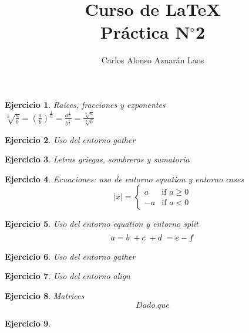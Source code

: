 \documentclass[12pt,a4paper]{article}
\author{Carlos Alonso Aznarán Laos}
\title{Curso de \LaTeX \\ Práctica  N$ ^{\circ}$2}
\newtheorem{ejer}{Ejercicio}%
\begin{document}
\maketitle %
\begin{ejer}
Raíces, fracciones y exponentes\\
$\sqrt[n]{\frac{a}{b}} = (\frac{{a}}{{b}})^\frac{1}{n} = \frac{a^{\frac{1}{n}}}{b^{\frac{1}{n}}} = \frac{\sqrt[n]{a}}{\sqrt[n]{b}}$
\end{ejer}

\begin{ejer}
Uso del entorno gather
\end{ejer}

\begin{ejer}
Letras griegas, sombreros y sumatoria
\end{ejer}

\begin{ejer}
Ecuaciones: uso de entorno equation y entorno cases
\begin{equation*}
|x| =
\begin{cases}
a & \text{if $a\ge 0$}\\
-a & \text{if $a< 0$}
\end{cases}
\end{equation*}

\end{ejer}

\begin{ejer}
Uso del entorno equation y entorno split
\begin{equation*}
a = b\; + c\; + d\; =\\ e-f
\begin{split}
\end{split}
\end{equation*}
\end{ejer}
\begin{ejer}
Uso del entorno gather
\end{ejer}
\begin{ejer}
Uso del entorno align
\end{ejer}
\begin{ejer}
Matrices
\begin{equation*}
Dado\;que
\end{equation*}
\end{ejer}
\begin{ejer}

\end{ejer}
\end{document}
